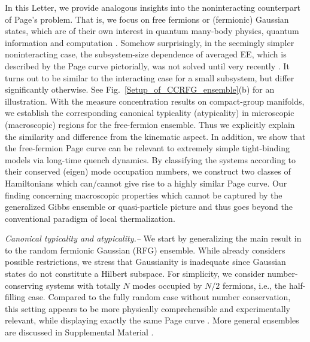 \documentclass[twocolumn,english,prl,aps,superscriptaddress,amsmath,amssymb,floatfix]{revtex4-2}
\begin{document}
In this Letter, we provide analogous insights into
the noninteracting counterpart of Page's problem.  
That is, we focus on free fermions or (fermionic) Gaussian states, which are of their own interest in quantum many-body physics, quantum information and computation \citep{matchgates,PhysRevA.65.032325,Bravyi2005,Wolf2006,Banuls2007,Fidkowski2010,PhysRevLett.116.030401,Shi2018,PhysRevLett.120.190501,PhysRevLett.121.200501,Circuit_complexity_free_fermion,fermionicTomograph1,Oszmaniec2022,Matos2022,PhysRevLett.119.020601,PhysRevB.100.165135,PhysRevB.106.035143}. Somehow surprisingly, in the seemingly simpler noninteracting
case, the subsystem-size dependence of averaged EE,
which is described by the Page curve pictorially, was not solved until
very recently \citep{Bianchi2021,Bianchi2021a,PhysRevB.104.214306}. It turns out to be similar to the interacting case for a small subsystem, but differ significantly otherwise. See Fig.~\ref{Setup_of_CCRFG_ensemble}(b) for an illustration. With the measure concentration results on compact-group manifolds,  we establish the corresponding 
canonical typicality (atypicality) in microscopic (macroscopic) regions for the free-fermion ensemble. Thus we explicitly explain the similarity and difference from the kinematic aspect. In addition, we show that the free-fermion Page curve can be relevant to extremely simple tight-binding models via long-time quench dynamics. By classifying the systems according to their conserved (eigen) mode occupation numbers, we construct two classes of Hamiltonians which can/cannot give rise to a highly similar Page curve. Our finding concerning macroscopic properties which cannot be captured by the generalized Gibbs ensemble or quasi-particle picture and thus goes beyond the conventional paradigm of local thermalization. 



\emph{Canonical typicality and atypicality.--}
We start by generalizing %
the main result in \citep{Popescu2006} to the random fermionic Gaussian (RFG) ensemble. While \citep{Popescu2006} already considers possible restrictions, we stress that Gaussianity is inadequate since Gaussian states do not constitute a Hilbert subspace. 
For simplicity, we 
consider number-conserving systems with totally $N$ modes occupied by $N/2$ fermions, i.e., the half-filling case. Compared to the fully random case without number conservation, this setting appears to be more physically comprehensible and experimentally relevant, while displaying exactly the same Page curve 
\citep{Bianchi2021a,Bianchi2021}. 
More general ensembles are discussed 
in Supplemental Material \cite{SM}. 
\end{document}
